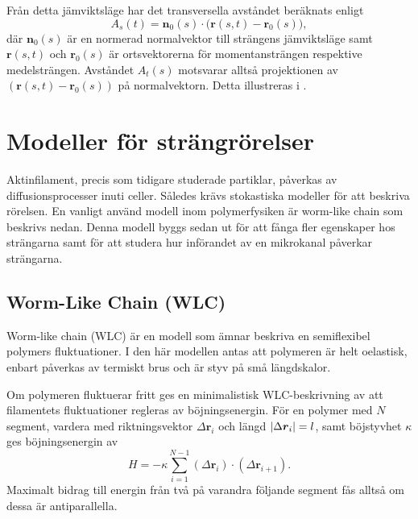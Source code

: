 Från detta jämviktsläge har det transversella avståndet beräknats enligt 
\begin{equation}
A_s(t) = \mathbf{n}_0(s)\cdot\Big(\mathbf{r}(s,t)-\mathbf{r}_0(s)\Big),
\end{equation}
där $\mathbf{n}_0(s)$ är en normerad normalvektor till strängens jämviktsläge samt $\mathbf{r}(s,t)$ och $\mathbf{r}_0(s)$ är ortsvektorerna för momentansträngen respektive medelsträngen. Avståndet $A_t(s)$ motsvarar alltså projektionen av $(\mathbf{r}(s,t)-\mathbf{r}_0(s))$ på normalvektorn. Detta 
illustreras i .



\section{Modeller för strängrörelser}

Aktinfilament, precis som tidigare studerade partiklar, påverkas av diffusionsprocesser inuti celler. Således krävs stokastiska modeller för att beskriva rörelsen. En vanligt använd modell inom polymerfysiken är worm-like chain som beskrivs nedan. Denna modell byggs sedan ut för att fånga fler egenskaper hos strängarna samt för att studera hur införandet av en mikrokanal påverkar strängarna. 



\subsection{Worm-Like Chain (WLC)}\label{WLCmodel}

Worm-like chain \cite{Milstein2013} (WLC) är en modell som ämnar beskriva en semiflexibel polymers fluktuationer. I den här modellen antas att polymeren är helt oelastisk, enbart påverkas av termiskt brus och är styv på små längdskalor. 

Om polymeren fluktuerar fritt %
ges en minimalistisk WLC-beskrivning av att filamentets fluktuationer regleras av böjningsenergin. För en polymer med $N$ segment, vardera med riktningsvektor $\Delta\mathbf{r}_i$ och längd $\abs{\Delta\boldsymbol{r}_{i}}=l$, samt böjstyvhet $\kappa$ ges böjningsenergin av
\begin{equation}
    H = -\kappa\sum_{i=1}^{N-1} (\Delta\mathbf{r}_{i}) \cdot (\Delta\mathbf{r}_{i+1}).
\end{equation}
Maximalt bidrag till energin från två på varandra följande segment fås alltså om dessa är antiparallella. 

